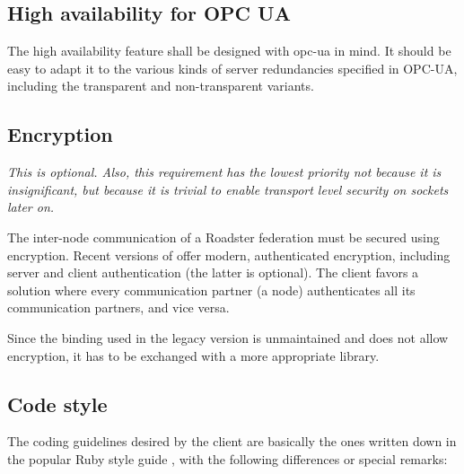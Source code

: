\subsection{High availability for OPC UA}
The high availability feature shall be designed with \gls{opc-ua} in mind. It
should be easy to adapt it to the various kinds of server redundancies specified
in OPC-UA, including the transparent and non-transparent variants.

\subsection{Encryption}
\emph{This is optional. Also, this requirement has the lowest priority not
because it is insignificant, but because it is trivial to enable transport level
security on \zmq sockets later on.}

The inter-node communication of a Roadster federation must be secured using
encryption. Recent versions of \zmq offer modern, authenticated encryption,
including server and client authentication (the latter is optional).
The client favors a solution where every communication partner (a node)
authenticates all its communication partners, and vice versa.

Since the \zmq binding used in the legacy version is unmaintained and does not
allow encryption, it has to be exchanged with a more appropriate library.

\subsection{Code style}
The coding guidelines desired by the client are basically the ones written down
in the popular Ruby style guide \cite{rb:style-guide}, with the following
differences or special remarks:

